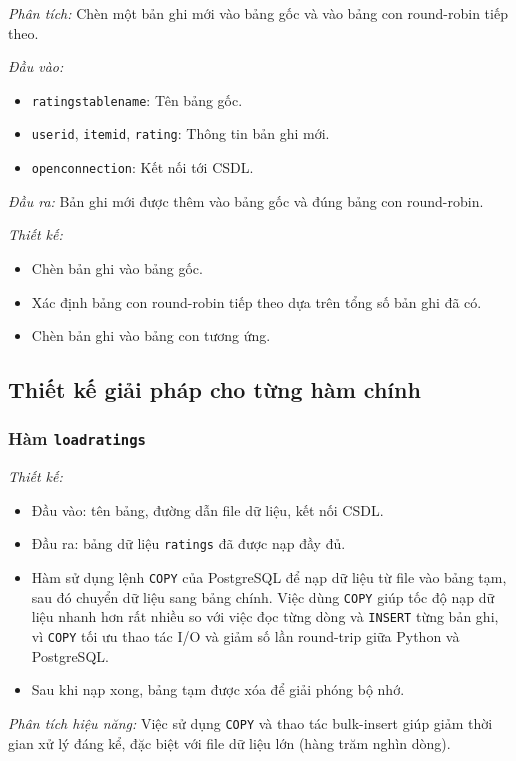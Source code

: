 \documentclass[14pt]{extarticle}
\begin{document}
\textit{Phân tích:}  
Chèn một bản ghi mới vào bảng gốc và vào bảng con round-robin tiếp theo.

\textit{Đầu vào:}
\begin{itemize}
    \item \texttt{ratingstablename}: Tên bảng gốc.
    \item \texttt{userid}, \texttt{itemid}, \texttt{rating}: Thông tin bản ghi mới.
    \item \texttt{openconnection}: Kết nối tới CSDL.
\end{itemize}

\textit{Đầu ra:}  
Bản ghi mới được thêm vào bảng gốc và đúng bảng con round-robin.

\textit{Thiết kế:}
\begin{itemize}
    \item Chèn bản ghi vào bảng gốc.
    \item Xác định bảng con round-robin tiếp theo dựa trên tổng số bản ghi đã có.
    \item Chèn bản ghi vào bảng con tương ứng.
\end{itemize}

\subsection{Thiết kế giải pháp cho từng hàm chính}

\subsubsection{Hàm \texttt{loadratings}}

\textit{Thiết kế:}
\begin{itemize}
    \item Đầu vào: tên bảng, đường dẫn file dữ liệu, kết nối CSDL.
    \item Đầu ra: bảng dữ liệu \texttt{ratings} đã được nạp đầy đủ.
    \item Hàm sử dụng lệnh \texttt{COPY} của PostgreSQL để nạp dữ liệu từ file vào bảng tạm, sau đó chuyển dữ liệu sang bảng chính. Việc dùng \texttt{COPY} giúp tốc độ nạp dữ liệu nhanh hơn rất nhiều so với việc đọc từng dòng và \texttt{INSERT} từng bản ghi, vì \texttt{COPY} tối ưu thao tác I/O và giảm số lần round-trip giữa Python và PostgreSQL.
    \item Sau khi nạp xong, bảng tạm được xóa để giải phóng bộ nhớ.
\end{itemize}
\textit{Phân tích hiệu năng:}  
Việc sử dụng \texttt{COPY} và thao tác bulk-insert giúp giảm thời gian xử lý đáng kể, đặc biệt với file dữ liệu lớn (hàng trăm nghìn dòng).
\end{document}
